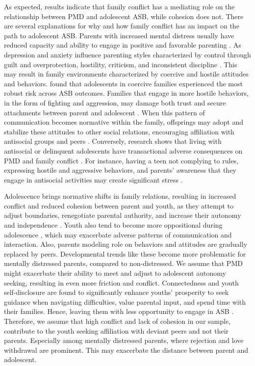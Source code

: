 As expected, results indicate that family conflict has a mediating role on the relationship between PMD and adolescent ASB, while cohesion does not. There are several explanations for why and how family conflict has an impact on the path to adolescent ASB. Parents with increased mental distress usually have reduced capacity and ability to engage in positive and favorable parenting \parencite{joyner:2021}. As depression and anxiety influence parenting styles characterized by control through guilt and overprotection, hostility, criticism, and inconsistent discipline \parencite{cummings:2005,korhonen:2014}. This may result in family environments characterized by coercive and hostile attitudes and behaviors. \textcite{lobraico:2020} found that adolescents in coercive families experienced the most robust risk across ASB outcomes. Families that engage in more hostile behaviors, in the form of fighting and aggression, may damage both trust and secure attachments between parent and adolescent \parencite{buehler:2006,weymouth:2016}. When this pattern of communication becomes normative within the family, offsprings may adopt and stabilize these attitudes to other social relations, encouraging affiliation with antisocial groups and peers \parencite{carroll:2009,ciranka:2021,moffitt:2015}. Conversely, research shows that living with antisocial or delinquent adolescents have transactional adverse consequences on PMD and family conflict \parencite{gross:2009}. For instance, having a teen not complying to rules, expressing hostile and aggressive behaviors, and parents' awareness that they engage in antisocial activities may create significant stress \parencite{allen:2010}.

Adolescence brings normative shifts in family relations, resulting in increased conflict and reduced cohesion between parent and youth, as they attempt to adjust boundaries, renegotiate parental authority, and increase their autonomy and independence \parencite{baer:2002,lin:2019,weymouth:2016}. Youth also tend to become more oppositional during adolescence \parencite{steinberg:2011}, which may exacerbate adverse patterns of communication and interaction. Also, parents modeling role on behaviors and attitudes are gradually replaced by peers. Developmental trends like these become more problematic for mentally distressed parents, compared to non-distressed. We assume that PMD might exacerbate their ability to meet and adjust to adolescent autonomy seeking, resulting in even more friction and conflict. Connectedness and youth self-disclosure are found to significantly enhance youths' prosperity to seek guidance when navigating difficulties, value parental input, and spend time with their families. Hence, leaving them with less opportunity to engage in ASB \parencite{ackard:2006,crawford:2008,vieno:2009}. Therefore, we assume that high conflict and lack of cohesion in our sample, contribute to the youth seeking affiliation with deviant peers and not their parents. Especially among mentally distressed parents, where rejection and love withdrawal are prominent. This may exacerbate the distance between parent and adolescent.

